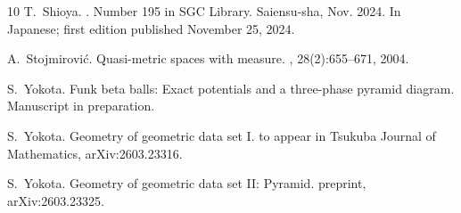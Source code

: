 \documentclass{amsart}
\theoremstyle{plain}
\theoremstyle{definition}
\theoremstyle{remark}
\begin{document}
\begin{thebibliography}{10}
T.~Shioya.
.
\newblock Number 195 in SGC Library. Saiensu-sha, Nov. 2024.
\newblock In Japanese; first edition published November 25, 2024.

A.~Stojmirovi{\'c}.
\newblock Quasi-metric spaces with measure.
, 28(2):655--671, 2004.

S.~Yokota.
\newblock Funk beta balls: Exact potentials and a three-phase pyramid diagram.
\newblock Manuscript in preparation.

S.~Yokota.
\newblock Geometry of geometric data set {I}.
\newblock to appear in Tsukuba Journal of Mathematics, arXiv:2603.23316.

S.~Yokota.
\newblock Geometry of geometric data set {II}: {P}yramid.
\newblock preprint, arXiv:2603.23325.

\end{thebibliography}
\end{document}
